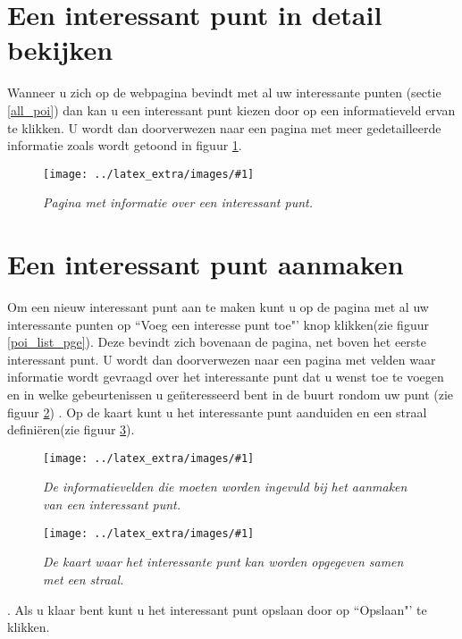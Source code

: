 \documentclass[11pt,twoside,a4paper]{report}
\newcommand*{\copyimageH}[4]{ 			%
	\begin{figure}[Ht]
	\texttt{[image: ../latex\_extra/images/\#1]}
	\caption{\textit{#4}}\label{#2}
	\end{figure}
}
\begin{document}
		\section{Een interessant punt in detail bekijken}\label{one_poi}
Wanneer u zich op de webpagina bevindt met al uw  interessante punten (sectie \ref{all_poi}) dan kan u een  interessant punt kiezen door op een informatieveld ervan te klikken. U wordt dan doorverwezen naar een pagina met meer gedetailleerde informatie zoals wordt getoond in figuur \ref{poi_show_pge}.
\copyimageH{poi_show.jpg}{poi_show_pge}{\textwidth}{Pagina met informatie over een interessant punt.}


		\section{Een interessant punt aanmaken}\label{create_poi}
Om een nieuw interessant punt aan te maken kunt u op de pagina met al uw interessante punten op ``Voeg een interesse punt toe"' knop klikken(zie figuur \ref{poi_list_pge}). Deze bevindt zich bovenaan de pagina, net boven het eerste interessant punt. U wordt dan doorverwezen naar een pagina met velden waar informatie wordt gevraagd over het  interessante punt dat u wenst toe te voegen en in welke gebeurtenissen u ge\"nteresseerd bent in de buurt rondom uw punt (zie figuur \ref{poi_add_pge}) . Op de kaart kunt u het  interessante punt aanduiden en een straal defini\"eren(zie figuur \ref{poi_add_map}).\\
\copyimageH{poi_add_1.jpg}{poi_add_pge}{\textwidth}{De informatievelden die moeten worden ingevuld bij het aanmaken van een  interessant punt.}
\copyimageH{poi_add_2.jpg}{poi_add_map}{\textwidth}{De kaart waar het  interessante punt kan worden opgegeven samen met een straal.}.
Als u klaar bent kunt u het  interessant punt opslaan door op ``Opslaan"' te klikken.
\end{document}
